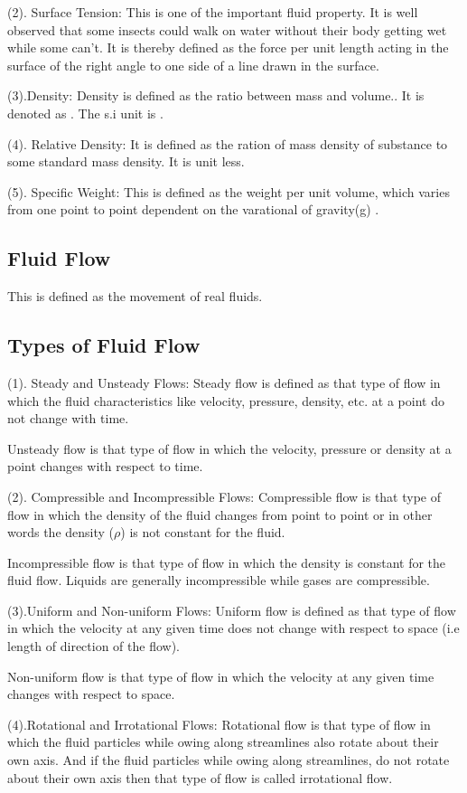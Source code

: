 \documentclass[a4paper, 12pt]{report}
\begin{document}
(2).	Surface Tension:
 This is one of the important fluid property. It is well observed that some insects could walk on water without their body getting wet while some can’t. It is thereby defined as the force per unit length acting in the surface of the right angle to one side of a line drawn in the surface.
 
 
(3).Density: Density is defined as the ratio between mass and volume.. It is denoted as . The s.i unit is .


(4).	Relative Density: It is defined as the ration of mass density of substance to some standard mass density. It is unit less.


(5).	Specific Weight: This is defined as the weight per unit volume, which varies from one point to point dependent on the varational of gravity(g) .

\subsection{Fluid Flow}
This is defined as the movement of real fluids.

\subsection{Types of Fluid Flow}
(1).	Steady and Unsteady Flows:
Steady flow is defined as that type of flow in which the fluid characteristics like velocity, pressure, density, etc. at a point do not change with time.

 Unsteady flow is that type of flow in which the velocity, pressure or density at a point changes with respect to time.
 
(2).	Compressible and Incompressible Flows:
Compressible flow is that type of flow in which the density of the fluid changes from point to point or in other words the density ($\rho$) is not constant for the fluid.

Incompressible flow is that type of flow in which the density is constant for the fluid flow. Liquids are generally incompressible while gases are compressible.


(3).Uniform and Non-uniform Flows:
Uniform flow is defined as that type of flow in which the velocity at any given time does not change with respect to space (i.e length of direction of the  flow).

Non-uniform flow is that type of flow in which the velocity at any
given time changes with respect to space.


(4).Rotational and Irrotational Flows:
Rotational flow is that type of flow in which the fluid particles while owing along streamlines also rotate about their own axis. And if the fluid particles while owing along streamlines, do not rotate about their
own axis then that type of flow is called irrotational flow.
\end{document}
